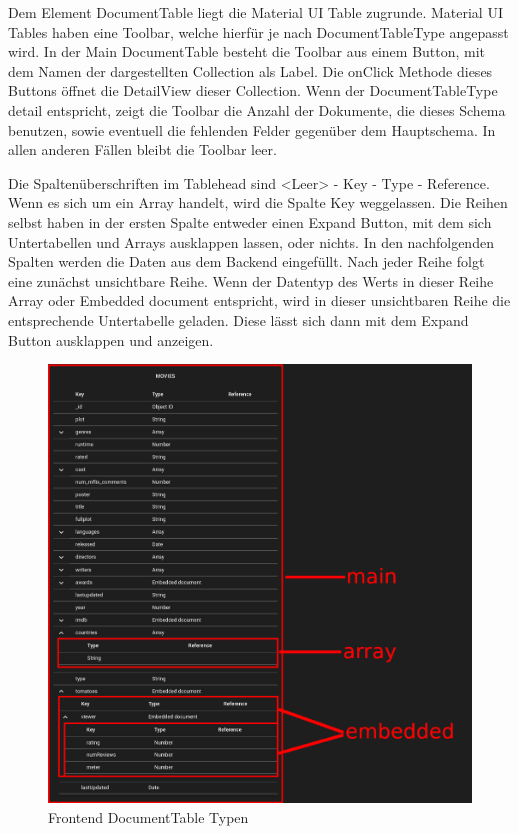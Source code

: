 Dem Element DocumentTable liegt die Material UI Table zugrunde.
Material UI Tables haben eine Toolbar, welche hierfür je nach DocumentTableType angepasst wird.
In der Main DocumentTable besteht die Toolbar aus einem Button, mit dem Namen der dargestellten Collection als Label.
Die onClick Methode dieses Buttons öffnet die DetailView dieser Collection.
Wenn der DocumentTableType detail entspricht, zeigt die Toolbar die Anzahl der Dokumente, die dieses Schema benutzen, sowie eventuell die fehlenden Felder gegenüber dem Hauptschema.
In allen anderen Fällen bleibt die Toolbar leer.

Die Spaltenüberschriften im Tablehead sind <Leer> - Key - Type - Reference.
Wenn es sich um ein Array handelt, wird die Spalte Key weggelassen.
Die Reihen selbst haben in der ersten Spalte entweder einen Expand Button, mit dem sich Untertabellen und Arrays ausklappen lassen, oder nichts.
In den nachfolgenden Spalten werden die Daten aus dem Backend eingefüllt.
Nach jeder Reihe folgt eine zunächst unsichtbare Reihe.
Wenn der Datentyp des Werts in dieser Reihe Array oder Embedded document entspricht, wird in dieser unsichtbaren Reihe die entsprechende Untertabelle geladen.
Diese lässt sich dann mit dem Expand Button ausklappen und anzeigen.

\begin{figure}[H]
    \includegraphics[width=360pt]{images/table_types}
    \caption{Frontend DocumentTable Typen}
    \label{fig:table_types}
\end{figure}

